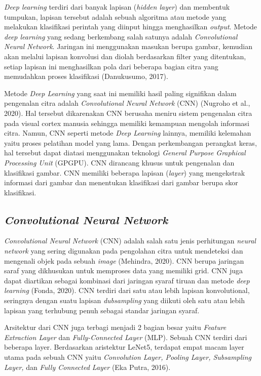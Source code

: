 \emph{Deep learning} terdiri dari banyak lapisan (\emph{hidden layer}) dan membentuk tumpukan, lapisan tersebut adalah sebuah algoritma atau metode yang melakukan klasifikasi perintah yang diinput hingga menghasilkan \emph{output}. Metode \emph{deep learning} yang sedang berkembang salah satunya adalah \emph{Convolutional Neural Network}. Jaringan ini menggunakan masukan berupa gambar, kemudian akan melalui lapisan konvolusi dan diolah berdasarkan filter yang ditentukan, setiap lapisan ini menghasilkan pola dari beberapa bagian citra yang memudahkan proses klasifikasi (Danukusumo, 2017).

Metode \emph{Deep Learning} yang saat ini memiliki hasil paling signifikan dalam pengenalan citra adalah \emph{Convolutional Neural Network} (CNN) (Nugroho et al., 2020). Hal tersebut dikarenakan CNN berusaha meniru sistem pengenalan citra pada visual cortex manusia sehingga memiliki kemampuan mengolah informasi citra. Namun, CNN seperti metode \emph{Deep Learning} lainnya, memiliki kelemahan yaitu proses pelatihan model yang lama. Dengan perkembangan perangkat keras, hal tersebut dapat diatasi menggunakan teknologi \emph{General Purpose Graphical Processing Unit} (GPGPU). CNN dirancang khusus untuk pengenalan dan klasifikasi gambar. CNN memiliki beberapa lapisan (\emph{layer}) yang mengekstrak informasi dari gambar dan menentukan klasifikasi dari gambar berupa skor klasifikasi.


\subsection{\emph{Convolutional Neural Network}}

\emph{Convolutional Neural Network} (CNN) adalah salah satu jenis perhitungan \emph{neural network} yang sering digunakan pada pengolahan citra untuk mendeteksi dan mengenali objek pada sebuah \emph{image} (Mehindra, 2020). CNN berupa jaringan saraf yang dikhusukan untuk memproses data yang memiliki grid. CNN juga dapat diartikan sebagai kombinasi dari jaringan syaraf tiruan dan metode \emph{deep learning} (Fonda, 2020). CNN terdiri dari satu atau lebih lapisan konvolutional, seringnya dengan suatu lapisan \emph{dubsampling} yang diikuti oleh satu atau lebih lapisan yang terhubung penuh sebagai standar jaringan syaraf.

Arsitektur dari CNN juga terbagi menjadi 2 bagian besar yaitu \emph{Feature Extraction Layer} dan \emph{Fully-Connected Layer} (MLP). Sebuah CNN terdiri dari beberapa layer. Berdasarkan aristektur LeNet5, terdapat empat macam layer utama pada sebuah CNN yaitu \emph{Convolution Layer, Pooling Layer, Subsampling Layer,} dan \emph{Fully Connected Layer} (Eka Putra, 2016).

